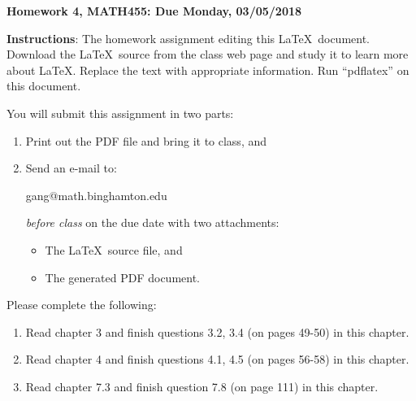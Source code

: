 \documentclass[12pt]{article}
\begin{document}
	
	\begin{title}
		{\Large\bf Homework 4, MATH455: Due Monday, 03/05/2018}
	\end{title}
	
	\author{\bf Your Name: (replace this)}
	
	\maketitle
	{\bf Instructions}:  The homework assignment editing this \LaTeX\ document.  Download the \LaTeX\ source from the class web page and study
	it to learn more about \LaTeX.  Replace the text with appropriate information.  Run ``pdflatex'' on this document.
	
	You will submit this assignment in two parts:
	\begin{enumerate}
		\item Print out the PDF file and bring it to class, and
		\item Send an e-mail to:
		\begin{center}
			gang@math.binghamton.edu
		\end{center}
		\emph{before class} on the due date with two attachments:
		\begin{itemize}
			\item The \LaTeX\ source file, and
			\item The generated PDF document.
		\end{itemize}
	\end{enumerate}
	\newpage
	Please complete the following:
	\begin{enumerate}
		\item Read chapter 3 and finish questions 3.2, 3.4  (on pages 49-50) in this chapter.
		\item Read chapter 4 and finish questions 4.1, 4.5  (on pages 56-58) in this chapter.
		\item Read chapter 7.3 and finish question 7.8 (on page 111) in this chapter.
		
		
		
	\end{enumerate}
	
\end{document}
